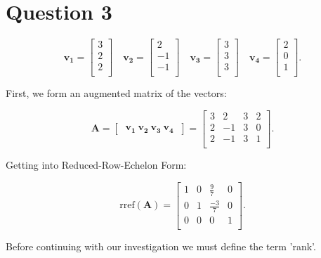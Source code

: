 \documentclass{article}
\begin{document}
\section{Question 3}
\[
\mathbf{v_1} =
\begin{bmatrix}
    3 \\
    2 \\
    2 \\
\end{bmatrix}
\quad
\mathbf{v_2} = 
\begin{bmatrix}
    2 \\
    -1 \\
    -1 \\
\end{bmatrix}
\quad
\mathbf{v_3} = 
\begin{bmatrix}
    3 \\
    3 \\
    3 \\
\end{bmatrix}
\quad
\mathbf{v_4} = 
\begin{bmatrix}
    2 \\
    0 \\
    1 \\
\end{bmatrix}
.\]

First, we form an augmented matrix of the vectors:

\[
    \mathbf{A} 
    =
    \begin{bmatrix} \
        \mathbf{v_1} \
        \mathbf{v_2} \
        \mathbf{v_3} \
        \mathbf{v_4} \
    \end{bmatrix}
    = 
    \begin{bmatrix}
        3 &  2 & 3 & 2 \\
        2 & -1 & 3 & 0 \\
        2 & -1 & 3 & 1 \\
    \end{bmatrix}
.\]

Getting into Reduced-Row-Echelon Form:

\[
    \text{rref}(\mathbf{A})
    =
    \begin{bmatrix}
        1 &  0 & \frac{9}{7}  & 0 \\
        0 &  1 & \frac{-3}{7} & 0 \\
        0 &  0 & 0            & 1 \\
    \end{bmatrix}
.\]


Before continuing with our investigation we must define the term 'rank'. 
\end{document}

